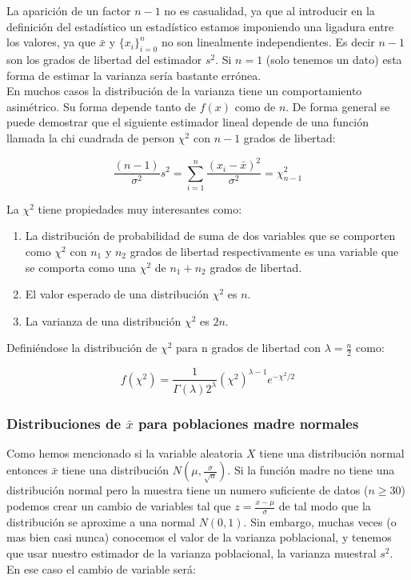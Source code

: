 \documentclass[12pt,a4paper]{book}
\newcommand{\corchetes}[1]{\{ #1 \}}
\newcommand{\parentesis}[1]{\left( #1 \right)}
\begin{document}
La aparición de un factor $n-1$ no es casualidad, ya que al introducir en la definición del estadístico un estadístico estamos imponiendo una ligadura entre los valores, ya que $\bar{x}$ y $\corchetes{x_i}_{i=0}^n$ no son linealmente independientes. Es decir $n-1$ son los grados de libertad del estimador $s^2$. Si $n=1$ (solo tenemos un dato) esta forma de estimar la varianza sería bastante errónea. \\


En muchos casos la distribución de la varianza tiene un comportamiento asimétrico. Su forma depende tanto de $f(x)$ como de $n$. De forma general se puede demostrar que el siguiente estimador lineal depende de una función llamada la chi cuadrada de person $\chi^2$ con $n-1$ grados de libertad:

\begin{equation}
\dfrac{(n-1)}{\sigma^2} s^2  =\sum_{i=1}^n \dfrac{(x_i-\bar{x})^2}{\sigma^2} = \chi^2_{n-1}
\end{equation}



La $\chi^2$ tiene propiedades muy interesantes como:

\begin{enumerate}
\item La distribución de probabilidad de suma de dos variables que se comporten como $\chi^2$ con $n_1$ y $n_2$ grados de libertad respectivamente es una variable que se comporta como una $\chi^2$ de $n_1+n_2$ grados de libertad. 
\item El valor esperado de una distribución $\chi^2$ es $n$.
\item La varianza de una distribución $\chi^2$ es $2n$. 
\end{enumerate}

Definiéndose la distribución de $\chi^2$ para n grados de libertad con $\lambda = \frac{n}{2}$ como:

\begin{equation}
f(\chi^2) = \dfrac{1}{\Gamma (\lambda) 2^{\lambda}} \parentesis{\chi^2}^{\lambda-1} e^{-\chi^2/2}
\end{equation}

\subsubsection{Distribuciones de $\bar{x}$ para poblaciones madre normales}


Como hemos mencionado si la variable aleatoria $X$ tiene una distribución normal entonces $\bar{x}$ tiene una distribución $N(\mu, \frac{\sigma}{\sqrt{n}})$. Si la función madre no tiene una distribución normal pero la muestra tiene un numero suficiente de datos ($n\geq 30$) podemos crear un cambio de variables tal que $z=\frac{x-\mu}{\sigma}$ de tal modo que la distribución se aproxime a una normal $N(0,1)$. Sin embargo, muchas veces (o mas bien casi nunca) conocemos el valor de la varianza poblacional, y tenemos que usar nuestro estimador de la varianza poblacional, la varianza muestral $s^2$.  En ese caso el cambio de variable será:
\end{document}
